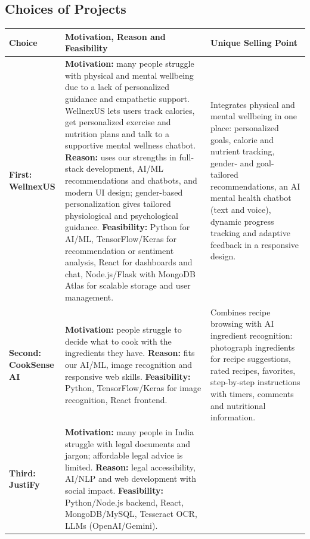 \documentclass[11pt,a4paper]{report}
\begin{document}
\subsection*{Choices of Projects}
\small
\begin{longtable}{|p{1.8cm}|p{7.4cm}|p{5.2cm}|}
\hline \textbf{Choice} & \textbf{Motivation, Reason and Feasibility} & \textbf{Unique Selling Point}\\\hline\endhead
\textbf{First: WellnexUS} &
\textbf{Motivation:} many people struggle with physical and mental wellbeing due to a lack of personalized guidance and empathetic support. WellnexUS lets users track calories, get personalized exercise and nutrition plans and talk to a supportive mental wellness chatbot.\newline
\textbf{Reason:} uses our strengths in full-stack development, AI/ML recommendations and chatbots, and modern UI design; gender-based personalization gives tailored physiological and psychological guidance.\newline
\textbf{Feasibility:} Python for AI/ML, TensorFlow/Keras for recommendation or sentiment analysis, React for dashboards and chat, Node.js/Flask with MongoDB Atlas for scalable storage and user management. &
Integrates physical and mental wellbeing in one place: personalized goals, calorie and nutrient tracking, gender- and goal-tailored recommendations, an AI mental health chatbot (text and voice), dynamic progress tracking and adaptive feedback in a responsive design.\\\hline
\textbf{Second: CookSense AI} &
\textbf{Motivation:} people struggle to decide what to cook with the ingredients they have.\newline
\textbf{Reason:} fits our AI/ML, image recognition and responsive web skills.\newline
\textbf{Feasibility:} Python, TensorFlow/Keras for image recognition, React frontend. &
Combines recipe browsing with AI ingredient recognition: photograph ingredients for recipe suggestions, rated recipes, favorites, step-by-step instructions with timers, comments and nutritional information.\\\hline
\textbf{Third: JustiFy} &
\textbf{Motivation:} many people in India struggle with legal documents and jargon; affordable legal advice is limited.\newline
\textbf{Reason:} legal accessibility, AI/NLP and web development with social impact.\newline
\textbf{Feasibility:} Python/Node.js backend, React, MongoDB/MySQL, Tesseract OCR, LLMs (OpenAI/Gemini). &

\end{longtable}
\end{document}

